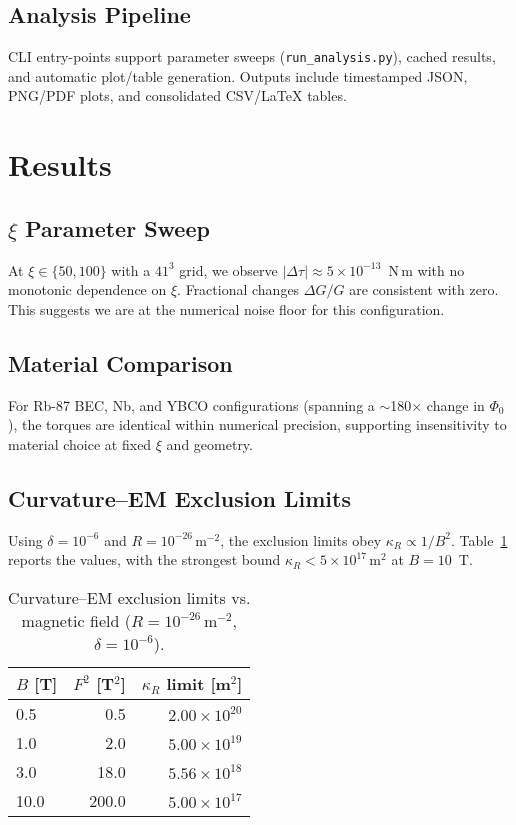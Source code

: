 \documentclass[10pt,twocolumn]{article}
\begin{document}
\subsection{Analysis Pipeline}
CLI entry-points support parameter sweeps (\texttt{run\_analysis.py}), cached results, and automatic plot/table generation. Outputs include timestamped JSON, PNG/PDF plots, and consolidated CSV/LaTeX tables.

\section{Results}
\subsection{$\xi$ Parameter Sweep}
At $\xi\in\{50,100\}$ with a $41^3$ grid, we observe $\lvert\Delta\tau\rvert \approx 5\times10^{-13}$~N\,m with no monotonic dependence on $\xi$. Fractional changes $\Delta G/G$ are consistent with zero. This suggests we are at the numerical noise floor for this configuration.

\subsection{Material Comparison}
For Rb-87 BEC, Nb, and YBCO configurations (spanning a $\sim$180$\times$ change in $\Phi_0$), the torques are identical within numerical precision, supporting insensitivity to material choice at fixed $\xi$ and geometry.

\subsection{Curvature--EM Exclusion Limits}
Using $\delta=10^{-6}$ and $R=10^{-26}\,\mathrm{m^{-2}}$, the exclusion limits obey $\kappa_R\propto 1/B^2$. Table~\ref{tab:kappaB} reports the values, with the strongest bound $\kappa_R<5\times10^{17}\,\mathrm{m^2}$ at $B=10$~T.

\begin{table}[t]
  \centering
  \caption{Curvature--EM exclusion limits vs. magnetic field ($R=10^{-26}\,\mathrm{m^{-2}}$, $\delta=10^{-6}$).}
  \label{tab:kappaB}
  \begin{tabular}{@{}lrr@{}}
    \toprule
    $B$ [T] & $F^2$ [T$^2$] & $\kappa_R$ limit [m$^2$] \\
    \midrule
    0.5  &  0.5  & $2.00\times10^{20}$ \\
    1.0  &  2.0  & $5.00\times10^{19}$ \\
    3.0  & 18.0  & $5.56\times10^{18}$ \\
    10.0 & 200.0 & $5.00\times10^{17}$ \\
    \bottomrule
  \end{tabular}
\end{table}
\end{document}
